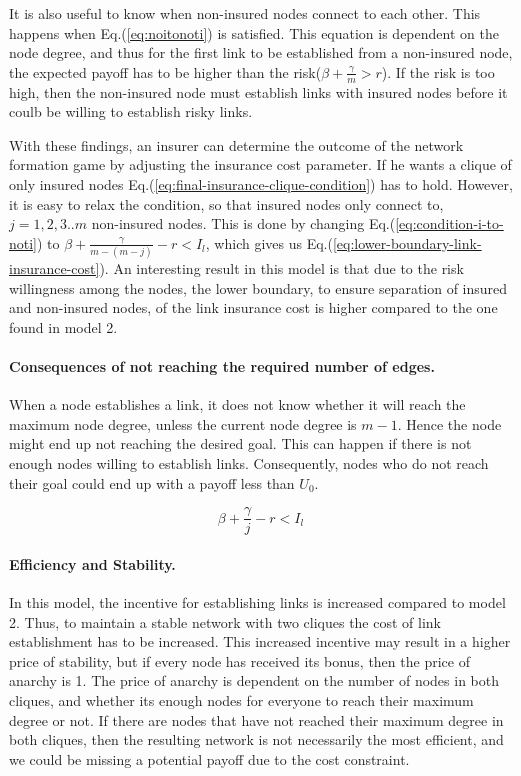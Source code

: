It is also useful to know when non-insured nodes connect to each other. This happens when Eq.(\ref{eq:noitonoti}) is satisfied. This equation is dependent on the node degree, and thus for the first link to be established from a non-insured node, the expected payoff has to be higher than the risk($\beta+\frac{\gamma}{m}>r$). If the risk is too high, then the non-insured node must establish links with insured nodes before it coulb be willing to establish risky links.

With these findings, an insurer can determine the outcome of the network formation game by adjusting the insurance cost parameter.
If he wants a clique of only insured nodes Eq.(\ref{eq:final-insurance-clique-condition}) has to
hold. However, it is easy to relax the condition, so that insured nodes only connect to, $j=1,2,3..m$ non-insured nodes.
   This is done by changing Eq.(\ref{eq:condition-i-to-noti}) to $\beta+\frac{\gamma}{m-(m-j)}-r<I_{l}$, which
    gives us Eq.(\ref{eq:lower-boundary-link-insurance-cost}).
An interesting result in this model is that due to the risk willingness among the nodes, the lower boundary, to ensure separation of insured and non-insured nodes, of the link insurance cost is higher compared to the one found in model 2. 

\paragraph{Consequences of not reaching the required number of edges.} When a node establishes a link, it does not know whether it will reach the maximum node degree, unless the current node degree is $m-1$. Hence the node might end up not reaching the desired goal. This can happen if there is not enough nodes willing to establish links. Consequently, nodes who do not reach their goal could end up with a payoff less than $U_{0}$. 

\begin{equation} 
\beta+\frac{\gamma}{j}-r<I_{l}
\label{eq:lower-boundary-link-insurance-cost}
\end{equation} 



\paragraph{Efficiency and Stability.}

In this model, the incentive for establishing links is increased compared to model 2. Thus, to maintain a stable network with two cliques the cost of link establishment has to be increased. This increased incentive may result in a higher price of stability, but if every node has received its bonus, then the price of anarchy is 1. The price of anarchy is dependent on the number of nodes in both cliques, and whether its enough nodes for everyone to reach their maximum degree or not. 
If there are nodes that have not reached their maximum degree in both cliques, then the resulting network is not necessarily the most efficient, and we could be missing a potential payoff due to the cost constraint. 

